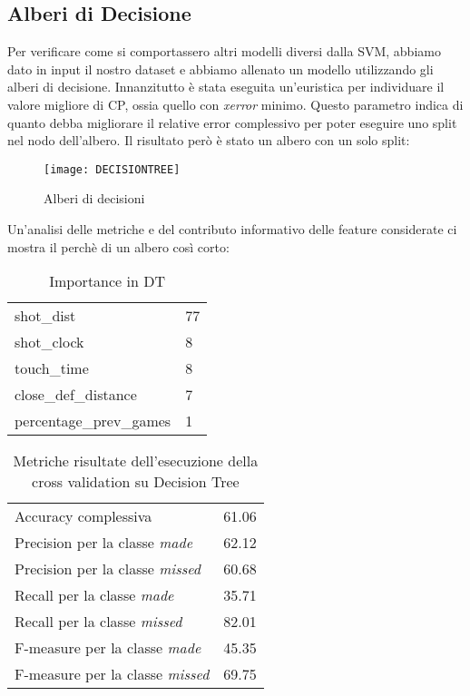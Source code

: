 \subsection{Alberi di Decisione}
Per verificare come si comportassero altri modelli diversi dalla SVM, abbiamo dato in input il nostro dataset e abbiamo allenato un modello utilizzando gli alberi di decisione.
Innanzitutto è stata eseguita un'euristica per individuare il valore migliore di CP, ossia quello con \textit{xerror} minimo. Questo parametro indica di quanto debba migliorare il relative error complessivo per poter eseguire uno split nel nodo dell'albero.
Il risultato però è stato un albero con un solo split:

\begin{figure}[H]
\caption{Alberi di decisioni}
\label{dt_fig}
  \texttt{[image: DECISIONTREE]}
\end{figure}


Un'analisi delle metriche e del contributo informativo delle feature considerate ci mostra il perchè di un albero così corto:
\begin{table}[H]
\centering
  \begin{tabular}{l l} 
shot\_dist &77\\
shot\_clock &8\\
touch\_time &8\\
close\_def\_distance &7\\
percentage\_prev\_games &1\\
    \end{tabular}
    \caption{Importance in DT}
\end{table}

\begin{table}[h!]
\centering
  \begin{tabular}{l l} 
  Accuracy complessiva & 61.06\\
  Precision per la classe \textit{made} & 62.12\\
  Precision per la classe \textit{missed} & 60.68\\
  Recall per la classe \textit{made} & 35.71\\
  Recall per la classe \textit{missed} & 82.01\\
  F-measure per la classe \textit{made} & 45.35\\
  F-measure per la classe \textit{missed} & 69.75\\
    \end{tabular}
    \caption{Metriche risultate dell'esecuzione della cross validation su Decision Tree}
\end{table}

